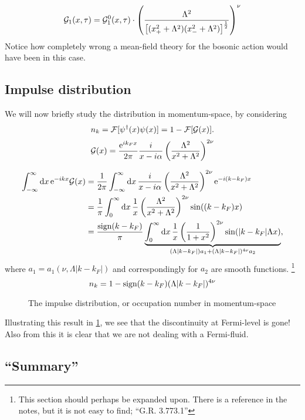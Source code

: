 \begin{equation}
\mathcal{G}_1(x, \tau) = \mathcal{G}_1^0(x, \tau)\cdot\left(\frac{\Lambda^2}{\left[(x_+^2+\Lambda^2)(x_-^2+\Lambda^2)\right]^{\frac12}}\right)^\nu
\end{equation}
Notice how completely wrong a mean-field theory for the bosonic action would have been in this case.

\subsection{Impulse distribution} %
We will now briefly study the distribution in momentum-space, by considering
\begin{equation*}
n_k = \mathcal{F}[\psi^\dagger(x)\psi(x)] = 1-\mathcal{F}[\mathcal{G}(x)].
\end{equation*}
\[\mathcal{G}(x) = \frac{\mathrm{e}^{ik_Fx}}{2\pi}\frac{i}{x-i\alpha}\left(\frac{\Lambda^2}{x^2+\Lambda^2}\right)^{2\nu}\]

\begin{align*}
\int_{-\infty}^\infty\dd{x}\mathrm{e}^{-ikx}\mathcal{G}(x) &= \frac{1}{2\pi}\int_{-\infty}^\infty\dd{x}\frac{i}{x-i\alpha}\left(\frac{\Lambda^2}{x^2+\Lambda^2}\right)^{2\nu}\mathrm{e}^{-i(k-k_F)x} \\
&= \frac{1}{\pi}\int_0^\infty\dd{x}\frac{1}{x}\left(\frac{\Lambda^2}{x^2+\Lambda^2}\right)^{2\nu}\sin((k-k_F)x)\\
&= \frac{\text{sign}(k-k_F)}{\pi}\underbrace{\int_0^\infty\dd{x}\frac1x\left(\frac{1}{1+x^2}\right)^{2\nu}\sin(|k-k_F|\Lambda x)}_{(\Lambda|k-k_F|)a_1 + (\Lambda|k-k_F|)^{4\nu}a_2},
\end{align*}
where \(a_1 = a_1(\nu, \Lambda|k-k_F|)\) and correspondingly for \(a_2\) are smooth functions. \footnote{This section should perhaps be expanded upon. There is a reference in the notes, but it is not easy to find; ``G.R. 3.773.1''}
\begin{equation}
n_k = 1-\text{sign}(k-k_F)(\Lambda|k-k_F|)^{4\nu}
\end{equation}
\begin{figure}
	\centering
	
	\caption{The impulse distribution, or occupation number in momentum-space}
	\label{fig:occupation_k}
\end{figure}
Illustrating this result in \cref{fig:occupation_k}, we see that the discontinuity at Fermi-level is gone! Also from this it is clear that we are not dealing with a Fermi-fluid.

\subsection{``Summary''} %
